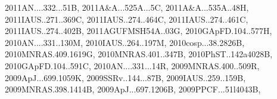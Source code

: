 \documentclass[12pt]{article}
\begin{document}
\begin{enumerate}
\begin{enumerate}
{2011AN....332...51B,%
2011A&A...525A...5C,%
2011A&A...535A..48H,%
2011IAUS..271..369C,%
2011IAUS..274..464C,%
2011IAUS..274..461C,%
2011IAUS..274..402B,%
2011AGUFMSH54A..03G,%
2010GApFD.104..577H,%
2010AN....331..130M,%
2010IAUS..264..197M,%
2010cosp...38.2826B,%
2010MNRAS.409.1619G,%
2010MNRAS.401..347B,%
2010PhST..142a4028B,%
2010GApFD.104..591C,%
2010AN....331...14R,%
2009MNRAS.400..509R,%
2009ApJ...699.1059K,%
2009SSRv..144...87B,%
2009IAUS..259..159B,%
2009MNRAS.398.1414B,%
2009ApJ...697.1206B,%
2009PPCF...51l4043B,%
}
\end{enumerate}
\end{enumerate}
\end{document}
